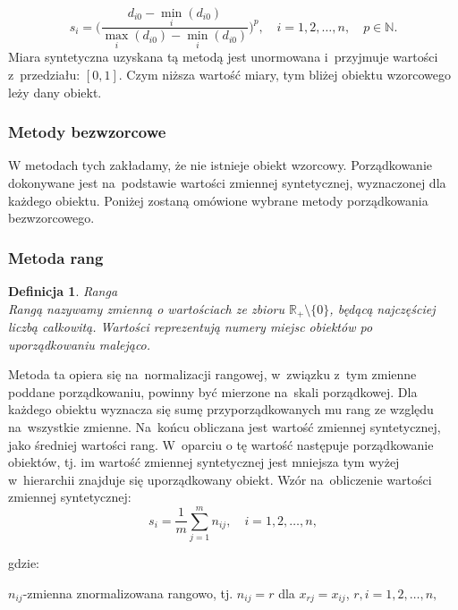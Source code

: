 \documentclass[12pt,a4paper]{report}
\newtheorem{definition}[theorem]{Definicja}
\begin{document}
$$s_{i}=\bigg(\frac{d_{i0}-\min\limits_{i}(d_{i0})}{\max\limits_{i}(d_{i0})-\min\limits_{i}(d_{i0})} \bigg)^{p}, \quad i=1,2,\dots,n, \quad p \in \mathbb{N}.
$$
Miara syntetyczna uzyskana tą metodą jest unormowana i~przyjmuje wartości z~przedziału: $[0,1]$. Czym niższa wartość miary, tym bliżej obiektu wzorcowego leży dany obiekt. 
\subsubsection{Metody bezwzorcowe}


W metodach tych zakładamy, że nie istnieje obiekt wzorcowy. %
Porządkowanie dokonywane jest na~podstawie wartości zmiennej syntetycznej, wyznaczonej dla każdego obiektu. 
Poniżej zostaną omówione wybrane metody porządkowania bezwzorcowego.

\subsubsection{Metoda rang}

\begin{definition}{Ranga \cite[Rozdział 1.5]{panek2013}}\\
Rangą nazywamy zmienną o wartościach ze zbioru ${\mathbb{R}_{+}\setminus{\{0\}}}$, będącą najczęściej liczbą całkowitą. Wartości reprezentują numery miejsc obiektów po uporządkowaniu malejąco.
\end{definition}
Metoda ta opiera się na~normalizacji rangowej, w~związku z~tym zmienne poddane porządkowaniu, powinny być mierzone na~skali porządkowej. Dla każdego obiektu wyznacza się sumę przyporządkowanych mu rang ze względu na~wszystkie zmienne. Na~końcu obliczana jest wartość zmiennej syntetycznej, jako średniej wartości rang. W~oparciu o tę wartość następuje porządkowanie obiektów, tj. im wartość zmiennej syntetycznej jest mniejsza tym wyżej w~hierarchii znajduje się uporządkowany obiekt. Wzór na~obliczenie wartości zmiennej syntetycznej: 
$$
s_{i}=\frac{1}{m}\sum_{j=1}^{m} n_{ij},\quad i=1, 2, \ldots, n,
$$

gdzie:

$n_{ij}$-zmienna znormalizowana rangowo, tj. $n_{ij}=r$ dla $x_{rj}=x_{ij}$,
$r,i=1, 2, \ldots, n,$
\end{document}
